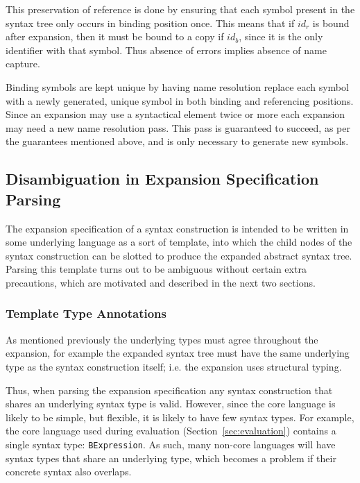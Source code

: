 \documentclass{kththesis}
\begin{document}
This preservation of reference is done by ensuring that each symbol present in the syntax tree only occurs in binding position once. This means that if $id_r$ is bound after expansion, then it must be bound to a copy if $id_b$, since it is the only identifier with that symbol. Thus absence of errors implies absence of name capture.

Binding symbols are kept unique by having name resolution replace each symbol with a newly generated, unique symbol in both binding and referencing positions. Since an expansion may use a syntactical element twice or more each expansion may need a new name resolution pass. This pass is guaranteed to succeed, as per the guarantees mentioned above, and is only necessary to generate new symbols.

\subsection{Disambiguation in Expansion Specification Parsing} \label{sec:disambiguation-implementation}

The expansion specification of a syntax construction is intended to be written in some underlying language as a sort of template, into which the child nodes of the syntax construction can be slotted to produce the expanded abstract syntax tree. Parsing this template turns out to be ambiguous without certain extra precautions, which are motivated and described in the next two sections.

\subsubsection{Template Type Annotations}

As mentioned previously the underlying types must agree throughout the expansion, for example the expanded syntax tree must have the same underlying type as the syntax construction itself; i.e. the expansion uses structural typing.

Thus, when parsing the expansion specification any syntax construction that shares an underlying syntax type is valid. However, since the core language is likely to be simple, but flexible, it is likely to have few syntax types. For example, the core language used during evaluation (Section~\ref{sec:evaluation}) contains a single syntax type: \texttt{BExpression}. As such, many non-core languages will have syntax types that share an underlying type, which becomes a problem if their concrete syntax also overlaps.
\end{document}
